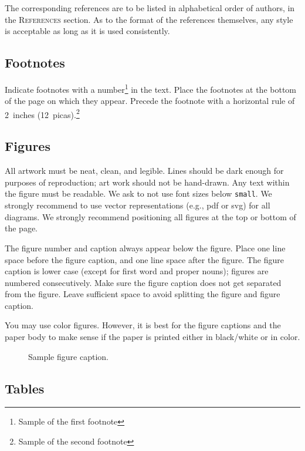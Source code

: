 \documentclass{article} %
\begin{document}
The corresponding references are to be listed in alphabetical order of
authors, in the \textsc{References} section. As to the format of the
references themselves, any style is acceptable as long as it is used
consistently.

\subsection{Footnotes}

Indicate footnotes with a number\footnote{Sample of the first footnote} in the
text. Place the footnotes at the bottom of the page on which they appear.
Precede the footnote with a horizontal rule of 2~inches
(12~picas).\footnote{Sample of the second footnote}

\subsection{Figures}

All artwork must be neat, clean, and legible. Lines should be dark
enough for purposes of reproduction; art work should not be
hand-drawn. Any text within the figure must be readable. We ask to not use font sizes below {\tt small}. We strongly recommend to use vector representations (e.g., pdf or svg) for all diagrams.
We strongly recommend positioning all figures at the top or bottom of the page.

The figure number and caption always appear below the figure. Place one line space before the figure caption, and one line space after the figure. The figure caption is lower case (except for first word and proper nouns); figures are numbered consecutively.
Make sure the figure caption does not get separated from the figure.
Leave sufficient space to avoid splitting the figure and figure caption.

You may use color figures.
However, it is best for the
figure captions and the paper body to make sense if the paper is printed
either in black/white or in color.
\begin{figure}[t]
\begin{center}
\fbox{\rule[-.5cm]{0cm}{4cm} \rule[-.5cm]{4cm}{0cm}}
\end{center}
\caption{Sample figure caption.}
\end{figure}

\subsection{Tables}
\end{document}
